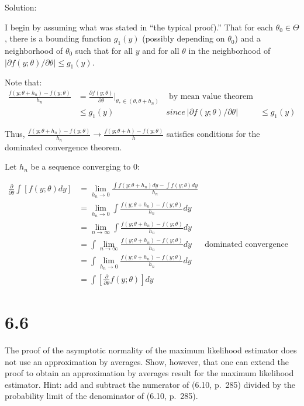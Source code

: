 \documentclass[
  letterpaper,
  DIV=11,
  numbers=noendperiod]{scrreprt}
\begin{document}
Solution:

I begin by assuming what was stated in ``the typical proof).'' That for
each \(\theta_0 \in \Theta\), there is a bounding function \(g_1(y)\)
(possibly depending on \(\theta_0\)) and a neighborhood of \(\theta_0\)
such that for all \(y\) and for all \(\theta\) in the neighborhood of
\(|\partial f(y;\theta)/\partial \theta| \leq g_1(y)\).

Note that: \[\begin{aligned}
\frac{f(y;\theta+h_n) - f(y;\theta)}{h_n}&= \frac{\partial f(y;\theta)}{\partial \theta}\bigg|_{\theta_* \in (\theta, \theta + h_n)} &\text{ by mean value theorem}\\
&\leq g_1(y) & since~|\partial f(y;\theta)/\partial \theta| &\leq g_1(y)
\end{aligned}\]

Thus,
\(\frac{f(y;\theta+h_n) - f(y;\theta)}{h_n} \to \frac{f(y;\theta+h) - f(y;\theta)}{h}\)
satisfies conditions for the dominated convergence theorem.

Let \(h_n\) be a sequence converging to 0:

\[\begin{aligned}
\frac \partial {\partial \theta}\int\left[ f(y;\theta)dy\right]
&= \lim_{h_n \to 0} \frac{\int f(y;\theta+h_n)dy - \int f(y;\theta)dy}{h_n} \\
&= \lim_{h_n \to 0} \int \frac{f(y;\theta+h_n) - f(y;\theta)}{h_n} dy \\
&= \lim_{n \to \infty} \int \frac{f(y;\theta+h_n) - f(y;\theta)}{h_n} dy \\
&=\int\lim_{n \to \infty}  \frac{f(y;\theta+h_n) - f(y;\theta)}{h_n} dy &\text{dominated convergence theorem} \\ 
&=\int\lim_{h_n \to 0}  \frac{f(y;\theta+h_n) - f(y;\theta)}{h_n} dy \\
&=\int\left[\frac \partial {\partial \theta} f(y;\theta)\right] dy
\end{aligned}\]

\newpage

\hypertarget{section-43}{%
\section{6.6}\label{section-43}}

The proof of the asymptotic normality of the maximum likelihood
estimator does not use an approximation by averages. Show, however, that
one can extend the proof to obtain an approximation by averages result
for the maximum likelihood estimator. Hint: add and subtract the
numerator of (6.10, p.~285) divided by the probability limit of the
denominator of (6.10, p.~285).
\end{document}
